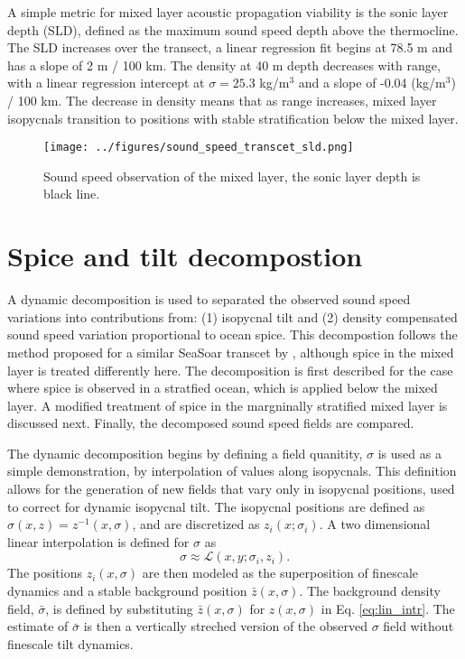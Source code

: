\documentclass[preprint]{JASA}
\begin{document}
A simple metric for mixed layer acoustic propagation viability is the sonic layer depth (SLD), defined as the maximum sound speed depth above the thermocline. The SLD increases over the transect, a linear regression fit begins at 78.5 m and has a slope of 2 m / 100 km. The density at 40 m depth decreases with range, with a linear regression intercept at $\sigma=25.3$ kg/m$^3$ and a slope of -0.04 (kg/m$^3$) / 100 km. The decrease in density means that as range increases, mixed layer isopycnals transition to positions with stable stratification below the mixed layer.

\begin{figure}
\texttt{[image: ../figures/sound\_speed\_transcet\_sld.png]}
\caption{\label{fig:transcet}{Sound speed observation of the mixed layer, the sonic layer depth is black line.}}
\end{figure}

\section{\label{sec:decomposition}Spice and tilt decompostion}
A dynamic decomposition is used to separated the observed sound speed variations into contributions from: (1) isopycnal tilt and (2) density compensated sound speed variation proportional to ocean spice. This decompostion follows the method proposed for a similar SeaSoar transcet by \citet{dzieciuch2004}, although spice in the mixed layer is treated differently here. The decomposition is first described for the case where spice is observed in a stratfied ocean, which is applied below the mixed layer. A modified treatment of spice in the margninally stratified mixed layer is discussed next. Finally, the decomposed sound speed fields are compared.

The dynamic decomposition begins by defining a field quanitity, $\sigma$ is used as a simple demonstration, by interpolation of values along isopycnals. This definition allows for the generation of new fields that vary only in isopycnal positions, used to correct for dynamic isopycnal tilt. The isopycnal positions are defined as $\sigma(x, z) = z^{-1}(x, \sigma)$, and are discretized as $z_i(x; \sigma_i)$. A two dimensional linear interpolation is defined for $\sigma$ as
\begin{equation}
    \sigma\approx\mathcal{L}(x, y; \sigma_i, z_i).
    \label{eq:lin_intr}
\end{equation}
The positions $z_i(x, \sigma)$ are then modeled as the superposition of finescale dynamics and a stable background position $\bar{z}(x, \sigma)$. The background density field, $\bar{\sigma}$, is defined by substituting $\bar{z}(x, \sigma)$ for $z(x, \sigma)$ in Eq. \eqref{eq:lin_intr}. The estimate of $\bar{\sigma}$ is then a vertically streched version of the observed $\sigma$ field without finescale tilt dynamics.
\end{document}

